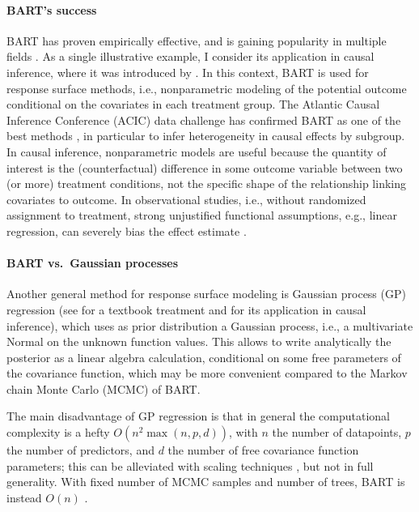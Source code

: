 \documentclass[a4paper]{article}
\theoremstyle{definition}
\let\oldmarginpar\marginpar
\renewcommand{\marginpar}[1]{\oldmarginpar{\sffamily\scriptsize #1}}
\begin{document}
    \paragraph{BART's success}
    
    BART has proven empirically effective, and is gaining popularity in multiple fields \autocite[consider, e.g.,][]{tan2019}. As a single illustrative example, I consider its application in causal inference, where it was introduced by \textcite{hill2011}. In this context, BART is used for response surface methods, i.e., nonparametric modeling of the potential outcome conditional on the covariates in each treatment group. The Atlantic Causal Inference Conference (ACIC) data challenge has confirmed BART as one of the best methods \autocite{dorie2019,hahn2019,acic2019,thal2023}, in particular to infer heterogeneity in causal effects by subgroup. In causal inference, nonparametric models are useful because the quantity of interest is the (counterfactual) difference in some outcome variable between two (or more) treatment conditions, not the specific shape of the relationship linking covariates to outcome. In observational studies, i.e., without randomized assignment to treatment, strong unjustified functional assumptions, e.g., linear regression, can severely bias the effect estimate \autocite[\S14.7, p.~332]{imbens2015}.

    \paragraph{BART vs.\ Gaussian processes}
    
    Another general method for response surface modeling is Gaussian process (GP) regression (see \textcite{gramacy2020} for a textbook treatment and \textcite{linero2022b} for its application in causal inference), which uses as prior distribution a Gaussian process, i.e., a multivariate Normal on the unknown function values. This allows to write analytically the posterior as a linear algebra calculation, conditional on some free parameters of the covariance function, which may be more convenient compared to the Markov chain Monte Carlo (MCMC) of BART.

    The main disadvantage of GP regression is that in general the computational complexity is a hefty $O(n^2\max(n,p,d))$,\marginpar{Not sure about the $d$, maybe goes away with backprop.} with $n$ the number of datapoints, $p$ the number of predictors, and $d$ the number of free covariance function parameters; this can be alleviated with scaling techniques \autocite[ch.~9]{gramacy2020}, but not in full generality. With fixed number of MCMC samples and number of trees, BART is instead $O(n)$ \autocite[although these assumptions are too strong in practice, see][\S8, p.~25]{hill2020}.
    
\end{document}
